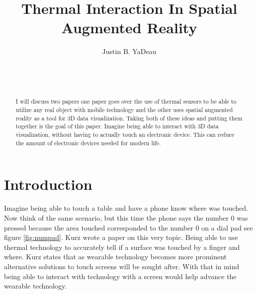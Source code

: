 \documentclass{sig-alternate}
\begin{document}

\title{Thermal Interaction In Spatial Augmented Reality}


\author{
\alignauthor
Justin B. YaDeau\\
	\\
	\\
	\\
}

\maketitle

\begin{abstract}
I will discuss two papers one paper goes over the use of thermal sensors to be able to utilize any real object with mobile technology and the other uses spatial augmented reality as a tool for 3D data visualization. Taking both of these ideas and putting them together is the goal of this paper. Imagine being able to interact with 3D data visualization, without having to actually touch an electronic device. This can reduce the amount of electronic devices needed for modern life.
\end{abstract}


\section{Introduction}
\label{sec:Introduction}
Imagine being able to touch a table and have a phone know where was touched. Now think of the same scenario, but this time the phone says the number 0 was pressed because the area touched corresponded to the number 0 on a dial pad see figure \ref{fig:numpad}. Kurz \cite{Thermal} wrote a paper on this very topic. Being able to use thermal technology to accurately tell if a surface was touched by a finger and where. Kurz \cite{Thermal} states that as wearable technology becomes more prominent alternative solutions to touch screens will be sought after. With that in mind being able to interact with technology with a screen would help advance the wearable technology.    
\end{document}
